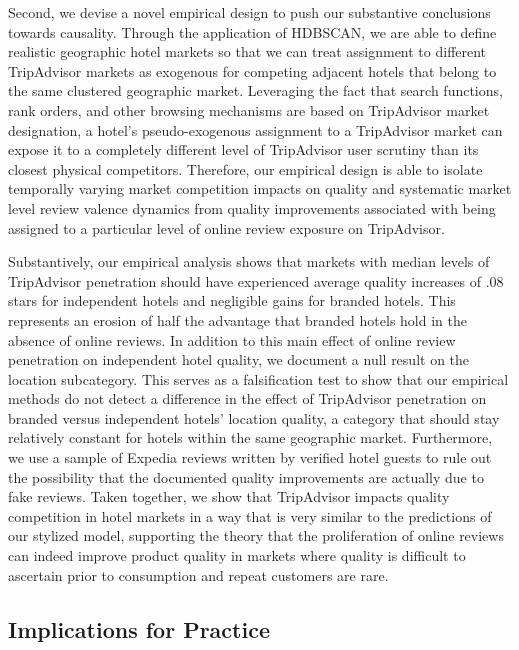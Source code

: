 \documentclass[12pt, leqno]{article}
\begin{document}
Second, we devise a novel empirical design to push our substantive conclusions towards causality. Through the application of HDBSCAN, we are able to define realistic geographic hotel markets so that we can treat assignment to different TripAdvisor markets as exogenous for competing adjacent hotels that belong to the same clustered geographic market. Leveraging the fact that search functions, rank orders, and other browsing mechanisms are based on TripAdvisor market designation, a hotel's pseudo-exogenous assignment to a TripAdvisor market can expose it to a completely different level of TripAdvisor user scrutiny than its closest physical competitors. Therefore, our empirical design is able to isolate temporally varying market competition impacts on quality and systematic market level review valence dynamics from quality improvements associated with being assigned to a particular level of online review exposure on TripAdvisor.

Substantively, our empirical analysis shows that markets with median levels of TripAdvisor penetration should have experienced average quality increases of .08 stars for independent hotels and negligible gains for branded hotels. This represents an erosion of half the advantage that branded hotels hold in the absence of online reviews. In addition to this main effect of online review penetration on independent hotel quality, we document a null result on the location subcategory. This serves as a falsification test to show that our empirical methods do not detect a difference in the effect of TripAdvisor penetration on branded versus independent hotels' location quality, a category that should stay relatively constant for hotels within the same geographic market. Furthermore, we use a sample of Expedia reviews written by verified hotel guests to rule out the possibility that the documented quality improvements are actually due to fake reviews. Taken together, we show that TripAdvisor impacts quality competition in hotel markets in a way that is very similar to the predictions of our stylized model, supporting the theory that the proliferation of online reviews can indeed improve product quality in markets where quality is difficult to ascertain prior to consumption and repeat customers are rare. 

\subsection{Implications for Practice}
\end{document}
